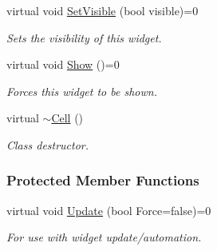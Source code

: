 \begin{DoxyCompactItemize}
virtual void \hyperlink{classphys_1_1UI_1_1Cell_aceb2d399897a502d99c72b2e9e5c859e}{SetVisible} (bool visible)=0
\begin{DoxyCompactList}\small\item\em Sets the visibility of this widget. \item\end{DoxyCompactList}\item 
\hypertarget{classphys_1_1UI_1_1Cell_ae0d424d873b9bb8712afbcc1bd548dc0}{
virtual void \hyperlink{classphys_1_1UI_1_1Cell_ae0d424d873b9bb8712afbcc1bd548dc0}{Show} ()=0}
\label{classphys_1_1UI_1_1Cell_ae0d424d873b9bb8712afbcc1bd548dc0}

\begin{DoxyCompactList}\small\item\em Forces this widget to be shown. \item\end{DoxyCompactList}\item 
\hypertarget{classphys_1_1UI_1_1Cell_a8bbad377a79e72497d033b2e8c06cfc4}{
virtual \hyperlink{classphys_1_1UI_1_1Cell_a8bbad377a79e72497d033b2e8c06cfc4}{$\sim$Cell} ()}
\label{classphys_1_1UI_1_1Cell_a8bbad377a79e72497d033b2e8c06cfc4}

\begin{DoxyCompactList}\small\item\em Class destructor. \item\end{DoxyCompactList}\end{DoxyCompactItemize}
\subsubsection*{Protected Member Functions}
\begin{DoxyCompactItemize}
\item 
\hypertarget{classphys_1_1UI_1_1Cell_a96227e2648a280f9f7baa0760f8643db}{
virtual void \hyperlink{classphys_1_1UI_1_1Cell_a96227e2648a280f9f7baa0760f8643db}{Update} (bool Force=false)=0}
\label{classphys_1_1UI_1_1Cell_a96227e2648a280f9f7baa0760f8643db}

\begin{DoxyCompactList}\small\item\em For use with widget update/automation. \item\end{DoxyCompactList}\end{DoxyCompactItemize}
